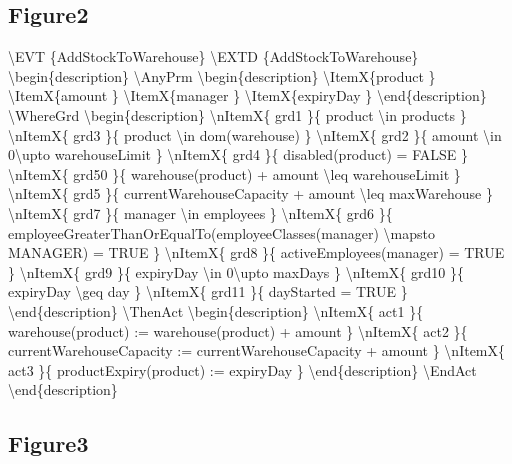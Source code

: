 \subsection{Figure2}
\label{figure2}

\textbackslash{}EVT \{AddStockToWarehouse\}
\textbackslash{}EXTD \{AddStockToWarehouse\}
\textbackslash{}begin\{description\}
\textbackslash{}AnyPrm
\textbackslash{}begin\{description\}
\textbackslash{}ItemX\{product \}
\textbackslash{}ItemX\{amount \}
\textbackslash{}ItemX\{manager \}
\textbackslash{}ItemX\{expiryDay \}
\textbackslash{}end\{description\}
\textbackslash{}WhereGrd
\textbackslash{}begin\{description\}
\textbackslash{}nItemX\{ grd1 \}\{ product \textbackslash{}in products \}
\textbackslash{}nItemX\{ grd3 \}\{ product \textbackslash{}in dom(warehouse) \}
\textbackslash{}nItemX\{ grd2 \}\{ amount \textbackslash{}in 0\textbackslash{}upto warehouseLimit \}
\textbackslash{}nItemX\{ grd4 \}\{ disabled(product) = FALSE \}
\textbackslash{}nItemX\{ grd50 \}\{ warehouse(product) + amount \textbackslash{}leq warehouseLimit \}
\textbackslash{}nItemX\{ grd5 \}\{ currentWarehouseCapacity + amount \textbackslash{}leq maxWarehouse \}
\textbackslash{}nItemX\{ grd7 \}\{ manager \textbackslash{}in employees \}
\textbackslash{}nItemX\{ grd6 \}\{ employeeGreaterThanOrEqualTo(employeeClasses(manager) \textbackslash{}mapsto MANAGER) = TRUE \}
\textbackslash{}nItemX\{ grd8 \}\{ activeEmployees(manager) = TRUE \}
\textbackslash{}nItemX\{ grd9 \}\{ expiryDay \textbackslash{}in 0\textbackslash{}upto maxDays \}
\textbackslash{}nItemX\{ grd10 \}\{ expiryDay \textbackslash{}geq day \}
\textbackslash{}nItemX\{ grd11 \}\{ dayStarted = TRUE \}
\textbackslash{}end\{description\}
\textbackslash{}ThenAct
\textbackslash{}begin\{description\}
\textbackslash{}nItemX\{ act1 \}\{ warehouse(product) := warehouse(product) + amount \}
\textbackslash{}nItemX\{ act2 \}\{ currentWarehouseCapacity := currentWarehouseCapacity + amount \}
\textbackslash{}nItemX\{ act3 \}\{ productExpiry(product) := expiryDay \}
\textbackslash{}end\{description\}
\textbackslash{}EndAct
\textbackslash{}end\{description\} 

\subsection{Figure3}
\label{figure3}

